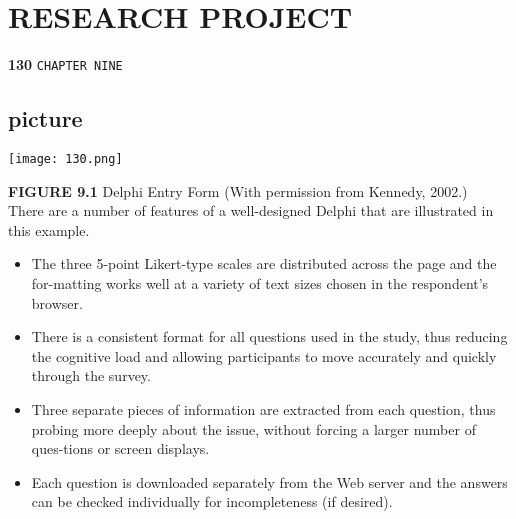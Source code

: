 \documentclass[a4,9pt]{beamer}
\begin{document}
\begin{frame}
\section*{RESEARCH PROJECT}
\begin{flushleft}
\textbf{130}\hspace*{1cm} \texttt{CHAPTER NINE}
\end{flushleft}

\vspace*{0.3cm}
\begin{center}
\section{picture}
\texttt{[image: 130.png]}

\end{center}
\end{frame}

\begin{frame}
\textbf{FIGURE 9.1} \hspace*{0.1cm} Delphi Entry Form (With permission from Kennedy, 2002.)\\

\vspace*{0.5cm}
There are a number of features of a well-designed Delphi that are illustrated in this example.\\ 

\vspace*{0.2cm}
\begin{itemize}
  \item The three 5-point Likert-type scales are distributed across the page and the for-matting works well at a variety of text sizes chosen in the respondent's browser.\\
  \item There is a consistent format for all questions used in the study, thus reducing the cognitive load and allowing participants to move accurately and quickly through the survey.\\
  \item Three separate pieces of information are extracted from each question, thus probing more deeply about the issue, without forcing a larger number of ques-tions or screen displays.\\
  \item Each question is downloaded separately from the Web server and the answers can be checked individually for incompleteness (if desired). \\ 
\end{itemize}
\end{frame}
\end{document}
